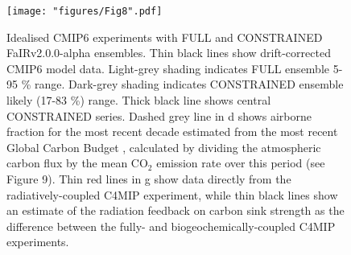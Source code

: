 \documentclass[gmd, manuscript]{copernicus}
\begin{document}
\begin{figure}[t]
    \texttt{[image: "figures/Fig8".pdf]}
    \caption{Idealised CMIP6 experiments with FULL and CONSTRAINED FaIRv2.0.0-alpha ensembles. Thin black lines show drift-corrected CMIP6 model data. Light-grey shading indicates FULL ensemble 5-95 \% range. Dark-grey shading indicates CONSTRAINED ensemble likely (17-83 \%) range. Thick black line shows central CONSTRAINED series. Dashed grey line in d shows airborne fraction for the most recent decade estimated from the most recent Global Carbon Budget \citep{Friedlingstein2020}, calculated by dividing the atmospheric carbon flux by the mean CO$_2$ emission rate over this period (see \citeauthor{Friedlingstein2020} Figure 9). Thin red lines in g show data directly from the radiatively-coupled C4MIP experiment, while thin black lines show an estimate of the radiation feedback on carbon sink strength as the difference between the fully- and biogeochemically-coupled C4MIP experiments.}
    \label{fig:idealisedNROY}
\end{figure}
\clearpage
\end{document}
